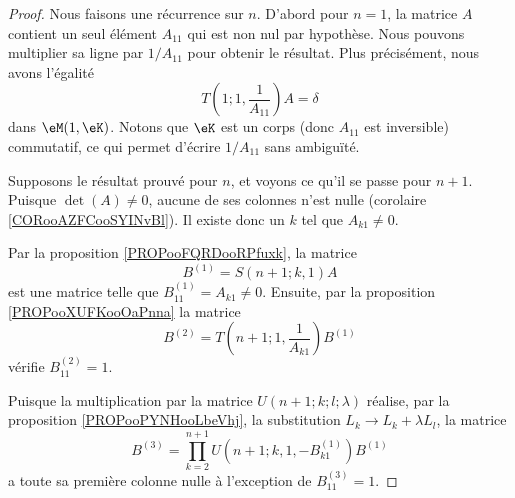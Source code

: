 \begin{proof}
	Nous faisons une récurrence sur \( n\). D'abord pour \( n=1\), la matrice \( A\) contient un seul élément \( A_{11}\) qui est non nul par hypothèse. Nous pouvons multiplier sa ligne par \( 1/A_{11}\) pour obtenir le résultat. Plus précisément, nous avons l'égalité
	\begin{equation}
		T(1;1,\frac{1}{ A_{11} })A=\delta
	\end{equation}
	dans \( \eM(1, \eK)\). Notons que \( \eK\) est un corps (donc \( A_{11}\) est inversible) commutatif, ce qui permet d'écrire \( 1/A_{11}\) sans ambiguïté.

	Supposons le résultat prouvé pour \( n\), et voyons ce qu'il se passe pour \( n+1\). Puisque \( \det(A)\neq 0\), aucune de ses colonnes n'est nulle (corolaire \ref{CORooAZFCooSYINvBl}). Il existe donc un \( k\) tel que \( A_{k1}\neq 0\).

	Par la proposition \ref{PROPooFQRDooRPfuxk}, la matrice
	\begin{equation}
		B^{(1)}=S(n+1;k,1)A
	\end{equation}
	est une matrice telle que \( B^{(1)}_{11}=A_{k1}\neq 0\). Ensuite, par la proposition \ref{PROPooXUFKooOaPnna} la matrice
	\begin{equation}
		B^{(2)}=T(n+1;1,\frac{1}{ A_{k1} })B^{(1)}
	\end{equation}
	vérifie \( B^{(2)}_{11}=1\).

	Puisque la multiplication par la matrice \( U(n+1;k;l;\lambda)\) réalise, par la proposition \ref{PROPooPYNHooLbeVhj}, la substitution \( L_k\to L_{k}+\lambda L_l\), la matrice
	\begin{equation}
		B^{(3)}=\prod_{k=2}^{n+1}U(n+1;k,1,-B^{(1)}_{k1})B^{(1)}
	\end{equation}
	a toute sa première colonne nulle à l'exception de \( B^{(3)}_{11}=1\).


\end{proof}

